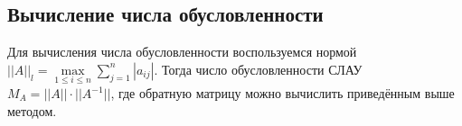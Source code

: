\documentclass[a4paper,12pt,titlepage,finall]{article}
\begin{document}
\subsection{Вычисление числа обусловленности}
Для вычисления числа обусловленности воспользуемся нормой $||A||_l = \max\limits_{1 \leq i \leq n} \sum\limits_{j=1}^n |a_{ij}|$. Тогда число обусловленности СЛАУ $M_A=||A|| \cdot ||A^{-1}||$, где обратную матрицу можно вычислить приведённым выше методом.
\end{document}
